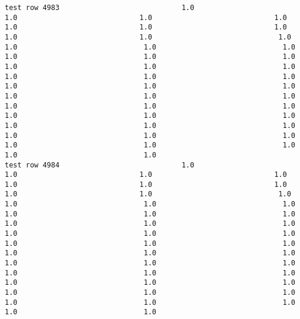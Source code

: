 \documentclass[11pt]{article}
\begin{document}
\begin{verbatim}
test row 4983                             1.0                             1.0                             1.0                             1.0                             1.0                             1.0                             1.0                             1.0                             1.0                              1.0                              1.0                              1.0                              1.0                              1.0                              1.0                              1.0                              1.0                              1.0                              1.0                              1.0                              1.0                              1.0                              1.0                              1.0                              1.0                              1.0                              1.0                              1.0                              1.0                              1.0                              1.0                              1.0                              1.0                              1.0                              1.0                              1.0                              1.0                              1.0                              1.0                              1.0                              1.0                              1.0                              1.0                              1.0                              1.0
test row 4984                             1.0                             1.0                             1.0                             1.0                             1.0                             1.0                             1.0                             1.0                             1.0                              1.0                              1.0                              1.0                              1.0                              1.0                              1.0                              1.0                              1.0                              1.0                              1.0                              1.0                              1.0                              1.0                              1.0                              1.0                              1.0                              1.0                              1.0                              1.0                              1.0                              1.0                              1.0                              1.0                              1.0                              1.0                              1.0                              1.0                              1.0                              1.0                              1.0                              1.0                              1.0                              1.0                              1.0                              1.0                              1.0

\end{verbatim}
\end{document}
